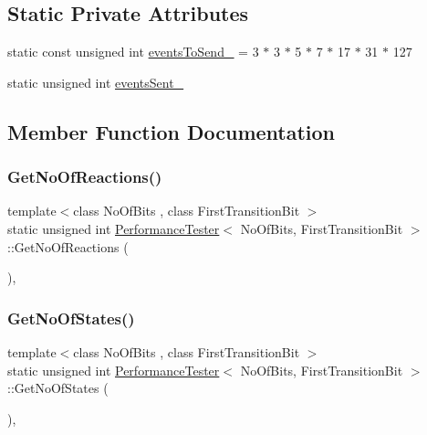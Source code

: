 \subsection*{Static Private Attributes}
\begin{DoxyCompactItemize}
\item 
static const unsigned int \mbox{\hyperlink{class_performance_tester_a0a244ac329b50e4619efcc4adf8c2c08}{events\+To\+Send\+\_\+}} = 3 $\ast$ 3 $\ast$ 5 $\ast$ 7 $\ast$ 17 $\ast$ 31 $\ast$ 127
\item 
static unsigned int \mbox{\hyperlink{class_performance_tester_ab776613ffedc9f7f5e05d1b79380a250}{events\+Sent\+\_\+}}
\end{DoxyCompactItemize}


\subsection{Member Function Documentation}
\mbox{\label{class_performance_tester_a9dfb85f931131f3e6a734e38683d25d2}} 
\subsubsection{\texorpdfstring{Get\+No\+Of\+Reactions()}{GetNoOfReactions()}}
{\footnotesize\ttfamily template$<$class No\+Of\+Bits , class First\+Transition\+Bit $>$ \\
static unsigned int \mbox{\hyperlink{class_performance_tester}{Performance\+Tester}}$<$ No\+Of\+Bits, First\+Transition\+Bit $>$\+::Get\+No\+Of\+Reactions (\begin{DoxyParamCaption}{ }\end{DoxyParamCaption})\hspace{0.3cm}{\ttfamily [inline]}, {\ttfamily [static]}}

\mbox{\label{class_performance_tester_aeeb48301ea3b298398a1e45c3d60991d}} 
\subsubsection{\texorpdfstring{Get\+No\+Of\+States()}{GetNoOfStates()}}
{\footnotesize\ttfamily template$<$class No\+Of\+Bits , class First\+Transition\+Bit $>$ \\
static unsigned int \mbox{\hyperlink{class_performance_tester}{Performance\+Tester}}$<$ No\+Of\+Bits, First\+Transition\+Bit $>$\+::Get\+No\+Of\+States (\begin{DoxyParamCaption}{ }\end{DoxyParamCaption})\hspace{0.3cm}{\ttfamily [inline]}, {\ttfamily [static]}}

